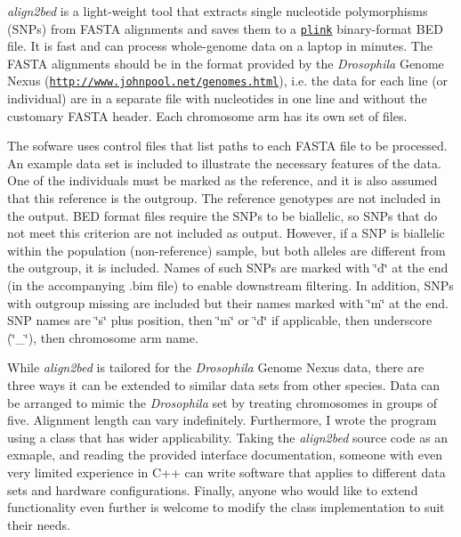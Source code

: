 {\itshape align2bed} is a light-\/weight tool that extracts single nucleotide polymorphisms (S\+N\+Ps) from F\+A\+S\+TA alignments and saves them to a \href{http://zzz.bwh.harvard.edu/plink/index.shtml}{\tt plink} binary-\/format B\+ED file. It is fast and can process whole-\/genome data on a laptop in minutes. The F\+A\+S\+TA alignments should be in the format provided by the {\itshape Drosophila} Genome Nexus (\href{http://www.johnpool.net/genomes.html}{\tt http\+://www.\+johnpool.\+net/genomes.\+html}), i.\+e. the data for each line (or individual) are in a separate file with nucleotides in one line and without the customary F\+A\+S\+TA header. Each chromosome arm has its own set of files.

The sofware uses control files that list paths to each F\+A\+S\+TA file to be processed. An example data set is included to illustrate the necessary features of the data. One of the individuals must be marked as the reference, and it is also assumed that this reference is the outgroup. The reference genotypes are not included in the output. B\+ED format files require the S\+N\+Ps to be biallelic, so S\+N\+Ps that do not meet this criterion are not included as output. However, if a S\+NP is biallelic within the population (non-\/reference) sample, but both alleles are different from the outgroup, it is included. Names of such S\+N\+Ps are marked with \char`\"{}d\char`\"{} at the end (in the accompanying .bim file) to enable downstream filtering. In addition, S\+N\+Ps with outgroup missing are included but their names marked with \char`\"{}m\char`\"{} at the end. S\+NP names are \char`\"{}s\char`\"{} plus position, then \char`\"{}m\char`\"{} or \char`\"{}d\char`\"{} if applicable, then underscore (\char`\"{}\+\_\+\char`\"{}), then chromosome arm name.

While {\itshape align2bed} is tailored for the {\itshape Drosophila} Genome Nexus data, there are three ways it can be extended to similar data sets from other species. Data can be arranged to mimic the {\itshape Drosophila} set by treating chromosomes in groups of five. Alignment length can vary indefinitely. Furthermore, I wrote the program using a class that has wider applicability. Taking the {\itshape align2bed} source code as an exmaple, and reading the provided interface documentation, someone with even very limited experience in C++ can write software that applies to different data sets and hardware configurations. Finally, anyone who would like to extend functionality even further is welcome to modify the class implementation to suit their needs.


